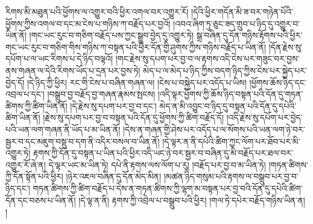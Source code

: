རིགས་མི་མཐུན་པའི་ཕྱོགས་ལ་འགྱུར་བའི་ཕྱིར་འགལ་བར་འགྱུར་རོ། །དེའི་ཕྱིར་གདོན་མི་ཟ་བར་གཉེན་པོའི་ཕྱོགས་ཀྱིས་འགལ་བ་དང་མ་ངེས་པ་གཉིས་ཀ་བརྗོད་པར་བྱའོ། །འབའ་ཞིག་ཏུ་ཅུང་ཟད་གྲུབ་པ་ཉིད་དུ་འགྱུར་བ་ཡིན་ནོ། །གང་ཡང་རུང་བ་གཅིག་བརྗོད་པས་ཀྱང་སྒྲུབ་བྱེད་དུ་འགྱུར་ཏེ། སྒྲ་བཞིན་དུ་དོན་གཉིས་རྟོགས་པའི་ཕྱིར་གང་ཡང་རུང་བ་གཅིག་གིས་གཉིས་ཀ་བསྟན་པའི་ཕྱིར་དོན་གྱི་ཤུགས་ཀྱིས་གཉིས་བརྗོད་པ་ཡིན་ནོ། །དོན་རྗེས་སུ་དཔོག་པ་ལ་ཡང་རིགས་པ་དེ་ཉིད་བལྟའོ། །གང་རྗེས་སུ་དཔག་པར་བྱ་བ་ལ་རྟགས་འདི་ངེས་པར་གཟུང་བར་བྱས་ནས་གཞན་ལ་དེའི་རིགས་ཡོད་པ་དྲན་པར་བྱས་ཏེ། མེད་པ་ལ་མེད་པ་ཉིད་ཀྱིས་བདག་ཉིད་ཀྱིས་ངེས་པར་སྐྱེད་པར་བྱེད་དོ། །དེ་ཉིད་ཀྱི་ཕྱིར། རང་གི་ངེས་པ་བཞིན་གཞན་ལ། །ངེས་པ་བསྐྱེད་པར་འདོད་པ་ཡིས། །ཕྱོགས་ཆོས་ཉིད་དང་འབྲལ་པ་དང་། །བསྒྲུབ་བྱ་བརྗོད་བྱ་གཞན་རྣམས་སྤངས། །འདི་ལྟར་ཕྱོགས་ཀྱི་ཆོས་ཉིད་བསྟན་པའི་དོན་དུ་གཏན་ཚིགས་ཀྱི་ཚིག་ཡིན་ནོ། །དེ་རྗེས་སུ་དཔག་པར་བྱ་བ་དང་། མེད་ན་མི་འབྱུང་བ་ཉིད་དུ་བསྟན་པའི་དོན་དུ་དཔེའི་ཚིག་ཡིན་ནོ། །རྗེས་སུ་དཔག་པར་བྱ་བ་བསྟན་པའི་དོན་དུ་ཕྱོགས་ཀྱི་ཚིག་བརྗོད་དོ། །འདི་རྗེས་སུ་དཔོག་པར་བྱེད་པའི་ཡན་ལག་གཞན་ནི་ཡོད་པ་མ་ཡིན་ནོ། །དེས་ན་གཞན་གྱི་ཤེས་པར་འདོད་པ་ལ་སོགས་པའི་ཡན་ལག་ཉེ་བར་སྦྱར་བ་དང་མཇུག་བསྡུ་བ་དག་ནི་འདིར་བསལ་བ་ཡིན་ནོ། །དེ་ལྟར་ན་ནི་དཔེའི་ཚིག་ཀྱང་ལོག་པར་ཐོབ་པར་མི་འགྱུར་ཏེ། རྟགས་ཀྱི་དོན་དུ་བསྟན་པ་ཡིན་པའི་ཕྱིར་འདི་ཡང་ཉེ་བར་སྦྱར་བ་བཞིན་དུ་མི་བརྗོད་པར་ཐལ་བར་འགྱུར་རོ་ཞེ་ན། དེ་ལྟར་ཡང་མ་ཡིན་ཏེ། དཔེ་ནི་རྟགས་ལས་ལོག་པ་རུ། །བརྗོད་པར་བྱ་བ་མ་ཡིན་ཏེ། །གཏན་ཚིགས་ཀྱི་དོན་སྟོན་པའི་ཕྱིར། །ཉེར་འཇལ་བཞིན་དུ་དོན་མེད་མིན། །མཚན་ཉིད་གསུམ་པའི་རྟགས་ལ་བསྒྲུབ་པར་བྱ་བ་ཉིད་དང་། གཏན་ཚིགས་ཀྱི་ཚིག་བརྗོད་པ་དེས་ན་གཏན་ཚིགས་ཀྱི་ལྷག་མ་བསྟན་པར་བྱ་བའི་དོན་དུ་དཔེའི་ཚིག་དོན་དང་བཅས་པ་ཡིན་ནོ། །དེ་ལྟ་ན་ནི། རྟགས་ཀྱི་འབྲེལ་པ་བསྒྲུབ་པའི་ཕྱིར། །གལ་ཏེ་དཔེར་བརྗོད་གཉིས་ཡིན་ན། །
